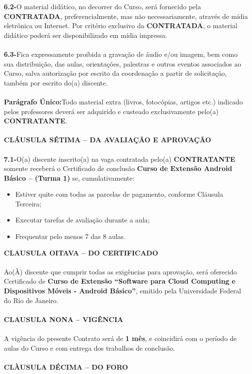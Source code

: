 \documentclass[a4paper,7.5pt]{article}
\newcommand{\thecourse}{``Software para Cloud Computing e Dispositivos Móveis - Android Básico''}
\begin{document}
{\bf6.2-}\indent O material didático, no decorrer do Curso, será fornecido pela {\bf CONTRATADA}, preferencialmente, mas não necessariamente, através de mídia eletrônica ou Internet. Por critério exclusivo da {\bf CONTRATADA}, o material didático poderá ser disponibilizado em mídia impressa.
\\\\
{\bf6.3-}\indent Fica expressamente proibida a gravação de áudio e/ou imagem, bem como sua distribuição, das aulas, orientações, palestras e outros eventos associados ao Curso, salva autorização por escrito da coordenação a partir de solicitação, também por escrito do(a) discente.
\\\\
{\bf Parágrafo Único:}\indent Todo material extra (livros, fotocópias, artigos etc.) indicado pelos professores deverá ser adquirido e custeado exclusivamente pelo(a) {\bf CONTRATANTE}.
\\\\
{\bf CLÁUSULA SÉTIMA – DA AVALIAÇÃO E APROVAÇÃO}
\\\\
{\bf7.1-}\indent O(a) discente inscrito(a) na vaga contratada pelo(a) {\bf CONTRATANTE} somente receberá o Certificado de conclusão {\bf Curso de Extensão Android Básico – (Turma 1)} se, cumulativamente:
\begin{itemize}
 \setlength{\itemsep}{1pt}
  \setlength{\parskip}{0pt}
  \setlength{\parsep}{0pt}
\item Estiver quite com todas as parcelas de pagamento, conforme Cláusula Terceira;
\item Executar tarefas de avaliação durante a aula;
\item Frequentar pelo menos 7 das 8 aulas.
\end{itemize}
{\bf CLAUSULA OITAVA – DO CERTIFICADO}
\\\\
\indent Ao(À) discente que cumprir todas as exigências para aprovação, será oferecido Certificado de {\bf Curso de Extensão \thecourse{}}, emitido pela Universidade Federal do Rio de Janeiro.
\\\\
{\bf CLAUSULA NONA – VIGÊNCIA}
\\\\
\indent A vigência do presente Contrato será de {\bf 1 mês}, e coincidirá com o período de aulas do Curso e com entrega dos trabalhos de conclusão.
\\\\
{\bf CLÀUSULA DÉCIMA – DO FORO}
\end{document}
